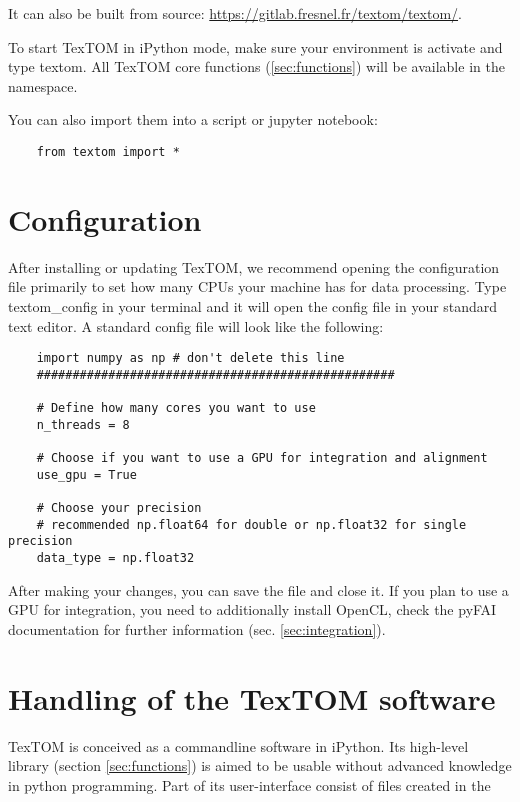 It can also be built from source: 
\url{https://gitlab.fresnel.fr/textom/textom/}.

To start TexTOM in iPython mode, make sure your environment is activate and type textom.
All TexTOM core functions (\ref{sec:functions}) will be available in the namespace.

You can also import them into a script or jupyter notebook:
\begin{verbatim}
    from textom import *
\end{verbatim}

\newpage
\section{Configuration}
After installing or updating TexTOM, we recommend opening the configuration file primarily to set how many CPUs your machine has
for data processing. Type textom\_config in your terminal and it will open the config file in your standard
text editor. A standard config file will look like the following:
\begin{verbatim}
    import numpy as np # don't delete this line
    ##################################################
    
    # Define how many cores you want to use 
    n_threads = 8 
    
    # Choose if you want to use a GPU for integration and alignment
    use_gpu = True
    
    # Choose your precision
    # recommended np.float64 for double or np.float32 for single precision
    data_type = np.float32
\end{verbatim}
After making your changes, you can save the file and close it.
If you plan to use a GPU for integration, you need to additionally install OpenCL, check the pyFAI documentation for
further information (sec. \ref{sec:integration}).
\newpage

\section{Handling of the TexTOM software}

TexTOM is conceived as a commandline software in iPython.
Its high-level library (section \ref{sec:functions}) is aimed to be usable without
advanced knowledge in python programming.
Part of its user-interface consist of files created in the 

